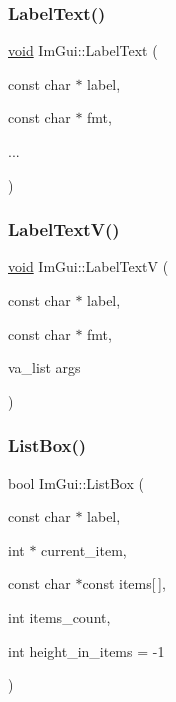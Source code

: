 \mbox{\label{namespaceImGui_ad92ccfbc33d448ff40cfcf9219177344}} 
\subsubsection{\texorpdfstring{Label\+Text()}{LabelText()}}
{\footnotesize\ttfamily \hyperlink{imgui__impl__opengl3__loader_8h_ac668e7cffd9e2e9cfee428b9b2f34fa7}{void} Im\+Gui\+::\+Label\+Text (\begin{DoxyParamCaption}\item[{const char $\ast$}]{label,  }\item[{const char $\ast$}]{fmt,  }\item[{}]{... }\end{DoxyParamCaption})}

\mbox{\label{namespaceImGui_a55e5a7edb676a8f5cd7f65443138a8a0}} 
\subsubsection{\texorpdfstring{Label\+Text\+V()}{LabelTextV()}}
{\footnotesize\ttfamily \hyperlink{imgui__impl__opengl3__loader_8h_ac668e7cffd9e2e9cfee428b9b2f34fa7}{void} Im\+Gui\+::\+Label\+TextV (\begin{DoxyParamCaption}\item[{const char $\ast$}]{label,  }\item[{const char $\ast$}]{fmt,  }\item[{va\+\_\+list}]{args }\end{DoxyParamCaption})}

\mbox{\label{namespaceImGui_a44379fe654f54ae8bd8cc1b88bf7c822}} 
\subsubsection{\texorpdfstring{List\+Box()}{ListBox()}\hspace{0.1cm}{\footnotesize\ttfamily [1/2]}}
{\footnotesize\ttfamily bool Im\+Gui\+::\+List\+Box (\begin{DoxyParamCaption}\item[{const char $\ast$}]{label,  }\item[{int $\ast$}]{current\+\_\+item,  }\item[{const char $\ast$const}]{items\mbox{[}$\,$\mbox{]},  }\item[{int}]{items\+\_\+count,  }\item[{int}]{height\+\_\+in\+\_\+items = {\ttfamily -\/1} }\end{DoxyParamCaption})}

